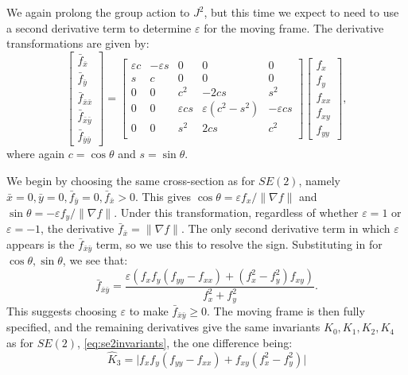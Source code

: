 \documentclass[review,onefignum,onetabnum]{siamonline190516}
\begin{document}
We again prolong the group action to $J^2$, but this time we expect to need
to use a second derivative term to determine $\varepsilon$ for the moving
frame. The derivative transformations are given by:
\begin{equation}
  \begin{bmatrix}
  \bar f_{\bar x} \\ \bar f_{\bar y} \\ \bar f_{\bar{x}\bar{x}} \\ \bar f_{\bar{x}\bar{y}} \\ \bar f_{\bar{y}\bar{y}}
  \end{bmatrix} = 
  \begin{bmatrix}
 \varepsilon c & -\varepsilon s & 0 & 0 & 0 \\
 s & c & 0 & 0 & 0 \\
0 & 0 & c^2 & -2cs & s^2 \\
0 & 0 & \varepsilon cs & \varepsilon(c^2 - s^2) & -\varepsilon cs \\
0 & 0 & s^2 & 2cs & c^2 \\
  \end{bmatrix}
  \begin{bmatrix}
f_x \\ f_y \\ f_{xx} \\ f_{xy} \\ f_{yy} 
  \end{bmatrix},
\label{eqn:E2prolongation}
\end{equation}
where again $c = \cos\theta$ and $s = \sin\theta$.  

We begin by choosing the same cross-section as for $SE(2)$, namely $\bar{x} = 0,
\bar{y} = 0, \bar{f}_{\bar{y}} = 0, \bar{f}_{\bar{x}} > 0$. This gives
$\cos\theta = \varepsilon f_x / \lVert \nabla f \rVert$ and $\sin\theta =
-\varepsilon f_y / \lVert \nabla f \rVert$. Under this transformation,
regardless of whether $\varepsilon = 1$ or $\varepsilon = -1$, the
derivative $\bar{f}_{\bar{x}} = \lVert \nabla f \rVert$. 
The only second derivative term in which $\varepsilon$ appears is
the $\bar{f}_{\bar{x}\bar{y}}$ term, so we use this to resolve the sign. Substituting in for $\cos\theta,
\sin\theta$, we see that:
\begin{equation*}
    \bar{f}_{\bar{x}\bar{y}} = \frac{\varepsilon(f_xf_y(f_{yy} - f_{xx}) + (f_x^2 -
    f_y^2)f_{xy})}{f_x^2 + f_y^2}.
\end{equation*}
This suggests choosing $\varepsilon$ to make $\bar{f}_{\bar{x}\bar{y}} \ge
0$. The moving frame is then fully specified, and the remaining derivatives
give the same invariants $K_0, K_1, K_2, K_4$ as for $SE(2)$,
\eqref{eq:se2invariants}, the one difference being:
\begin{equation}\label{eq:e2invariants}
    \hat{K}_3 = \lvert f_x f_y (f_{yy} - f_{xx}) + f_{xy} (f_x^2 - f_y^2)\rvert
\end{equation}
\end{document}
